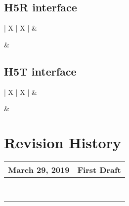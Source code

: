 \documentclass[12pt]{THG_Guide}
\begin{document}
\subsection{H5R interface}

\begin{tabularx}{\linewidth}{| X | X |}
\hline
 &  \\ \hline

& \\ \hline

\end{tabularx}

\subsection{H5T interface}

\begin{tabularx}{\linewidth}{| X | X |}
\hline
 &  \\ \hline

& \\ \hline

\end{tabularx}

\newpage
\section*{Revision History}

\begin{tabularx}{\linewidth}{| l | X |}
\hline
March 29, 2019 & First Draft \\
\hline
& \\
\hline
& \\
\hline
& \\
\hline
& \\
\hline
& \\
\hline
& \\
\hline
& \\
\hline
& \\
\hline
\end{tabularx}
\end{document}
